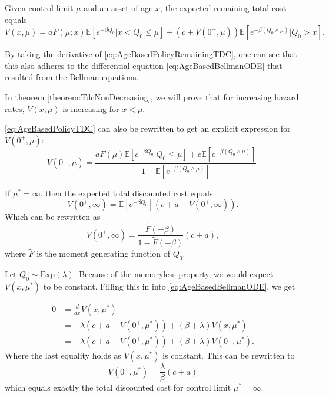 \begin{theorem}
	Given control limit $\mu$ and an asset of age $x$, the expected remaining total cost equals 
	\begin{equation}\label{eq:AgeBasedPolicyRemainingTDC}
	V(x,\mu)=aF(\mu;x)\mathbb{E}[e^{-\beta Q_0}|x<Q_0\leq \mu]+(c+V(0^+,\mu))\mathbb{E}[e^{-\beta(Q_0\wedge\mu)}|Q_0>x].
	\end{equation}
\end{theorem}

\begin{remark}
	By taking the derivative of \eqref{eq:AgeBasedPolicyRemainingTDC}, one can see that this also adheres to the differential equation \eqref{eq:AgeBasedBellmanODE} that resulted from the Bellman equations.
\end{remark}

\begin{remark}
	In theorem \ref{theorem:TdcNonDecreasing}, we will prove that for increasing hazard rates, $V(x,\mu)$ is increasing for $x<\mu$.
\end{remark}

\begin{remark}
	\eqref{eq:AgeBasedPolicyTDC} can also be rewritten to get an explicit expression for $V(0^+,\mu)$:
	\begin{equation}\label{eq:AgeBasedOptimalTDC}
	V(0^+,\mu)=\frac{aF(\mu)\mathbb{E}[e^{-\beta Q_0}|Q_0\leq \mu]+c\mathbb{E}[e^{-\beta(Q_0\wedge\mu)}]}{1-\mathbb{E}[e^{-\beta (Q_0\wedge\mu)}]}.
	\end{equation}
\end{remark}

\begin{remark}
	If $\mu^*=\infty$, then the expected total discounted cost equals
	\[V(0^+,\infty)=\mathbb{E}[e^{-\beta Q_0}](c+a+V(0^+,\infty)).\]
	Which can be rewritten as
	\[V(0^+,\infty)=\frac{\tilde{F}(-\beta)}{1-\tilde{F}(-\beta)}(c+a),\]
	where $\tilde{F}$ is the moment generating function of $Q_0$.
\end{remark}

\begin{example}
	Let $Q_0\sim\text{Exp}(\lambda)$.
	Because of the memoryless property, we would expect $V(x,\mu^*)$ to be constant.
	Filling this in into \eqref{eq:AgeBasedBellmanODE}, we get
	
	\[
	\begin{split}
	0&=\frac{d}{dx}V(x,\mu^*)\\
	&=-\lambda(c+a+ V(0^+,\mu^*))+(\beta+ \lambda) V(x,\mu^*)\\
	&=-\lambda(c+a+ V(0^+,\mu^*))+(\beta+ \lambda) V(0^+,\mu^*).
	\end{split}
	\]
	Where the last equality holds as $V(x,\mu^*)$ is constant.
	This can be rewritten to
	$$
	V(0^+,\mu^*)=\frac{\lambda}{\beta}(c+a)
	$$
	which equals exactly the total discounted cost for control limit $\mu^*=\infty$.
\end{example}